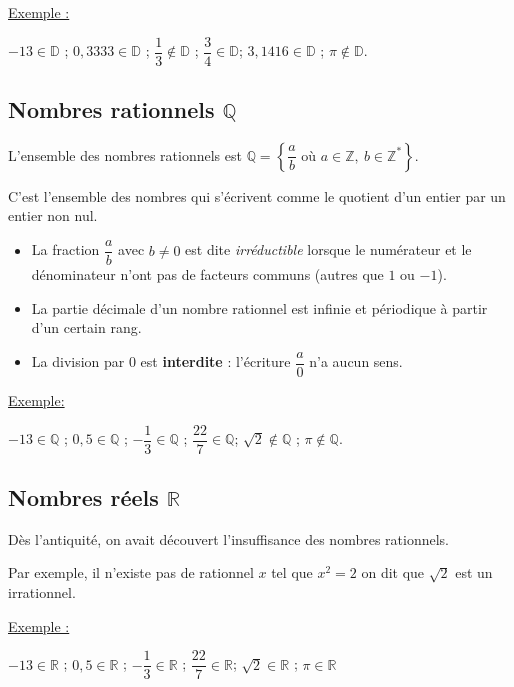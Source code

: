 \documentclass[french]{book}
\newcommand{\R}{\mathbb {R}}
\newcommand{\Z}{\mathbb {Z}}
\newcommand{\Q}{\mathbb {Q}}
\newcommand{\D}{\mathbb {D}}
\begin{document}
\medskip

\underline{Exemple :} 

\medskip

$-13 \in \D$ ; \hfill  $0,3333 \in \D$ ; \hfill $\dfrac{1}{3} \notin \D$ ; \hfill $\dfrac{3}{4} \in \D$; \hfill  $3,1416 \in \D$ ; \hfill $\pi \notin \D$.

\subsection*{Nombres rationnels $\Q$}
\begin{defn}

L'ensemble des  nombres rationnels  est $\Q=\left\{\dfrac{a}{b} \text{ où } a\in\Z,~b\in\Z^*\right\}$.

C'est l'ensemble des nombres qui s'écrivent comme le quotient d'un entier par un entier non nul.
\end{defn}

\medskip
\begin{itemize}
\item La fraction $\dfrac{a}{b}$ avec $b \ne 0$ est dite \emph{irréductible} lorsque le numérateur et le dénominateur n'ont pas de facteurs communs (autres que $1$ ou $-1$).
\item La partie décimale d'un nombre rationnel est infinie et périodique à partir d'un certain rang.
\item La division par 0 est \textbf{interdite} : l'écriture  $\dfrac{a}{0}$ n'a aucun sens.
\end{itemize}


\medskip

\underline{Exemple:}

\medskip

$-13 \in \Q$ ; \hfill  $0,5 \in \Q$ ; \hfill $-\dfrac{1}{3} \in \Q$ ; \hfill $\dfrac{22}{7} \in \Q$; \hfill  $\sqrt{2} \notin \Q$ ; \hfill $\pi \notin \Q$.

\subsection*{Nombres réels $\R$}
Dès l'antiquité, on avait découvert l'insuffisance des nombres rationnels. 

Par exemple, il n'existe pas de rationnel $x$ tel que $x^2 =2$ on dit que $\sqrt{2}$ est un irrationnel.

\underline{Exemple :}

$-13 \in \R$ ; \hfill  $0,5 \in \R$ ; \hfill $-\dfrac{1}{3} \in \R$ ; \hfill $\dfrac{22}{7} \in \R$; \hfill  $\sqrt{2} \in \R$ ; \hfill $\pi \in \R$
\end{document}
